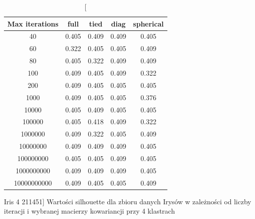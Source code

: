 \documentclass{classrep}
\begin{document}
{{            \begin{table}[!htbp]
                \begin{minipage}{1\textwidth}
                \centering
                \begin{tabular}{|c|c|c|c|c|}
                \hline
                Max iterations & full & tied & diag & spherical \\ \hline
                40 & 0.405 & 0.409 & 0.409 & 0.405 \\ \hline
                60 & 0.322 & 0.405 & 0.405 & 0.409 \\ \hline
                80 & 0.405 & 0.322 & 0.409 & 0.409 \\ \hline
                100 & 0.409 & 0.405 & 0.409 & 0.322 \\ \hline
                200 & 0.409 & 0.405 & 0.405 & 0.405 \\ \hline
                1000 & 0.409 & 0.405 & 0.405 & 0.376 \\ \hline
                10000 & 0.405 & 0.409 & 0.405 & 0.405 \\ \hline
                100000 & 0.405 & 0.418 & 0.409 & 0.322 \\ \hline
                1000000 & 0.409 & 0.322 & 0.405 & 0.409 \\ \hline
                10000000 & 0.409 & 0.409 & 0.409 & 0.405 \\ \hline
                100000000 & 0.405 & 0.405 & 0.409 & 0.405 \\ \hline
                1000000000 & 0.409 & 0.409 & 0.409 & 0.405 \\ \hline
                10000000000 & 0.409 & 0.405 & 0.405 & 0.409 \\ \hline
                \end{tabular}
                \caption
                [Iris 4 211451]
                {Wartości silhouette dla zbioru danych Irysów w zależności
                od liczby iteracji i wybranej macierzy kowariancji przy 4 klastrach}
                \label{Iris_4_211451}
                \end{minipage}
                \hfill
    

\end{table}}}
\end{document}
